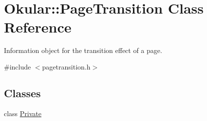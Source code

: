 \hypertarget{classOkular_1_1PageTransition}{\section{Okular\+:\+:Page\+Transition Class Reference}
\label{classOkular_1_1PageTransition}
}


Information object for the transition effect of a page.  




{\ttfamily \#include $<$pagetransition.\+h$>$}

\subsection*{Classes}
\begin{DoxyCompactItemize}
\item 
class \hyperlink{classPageTransition_1_1Private}{Private}
\end{DoxyCompactItemize}
